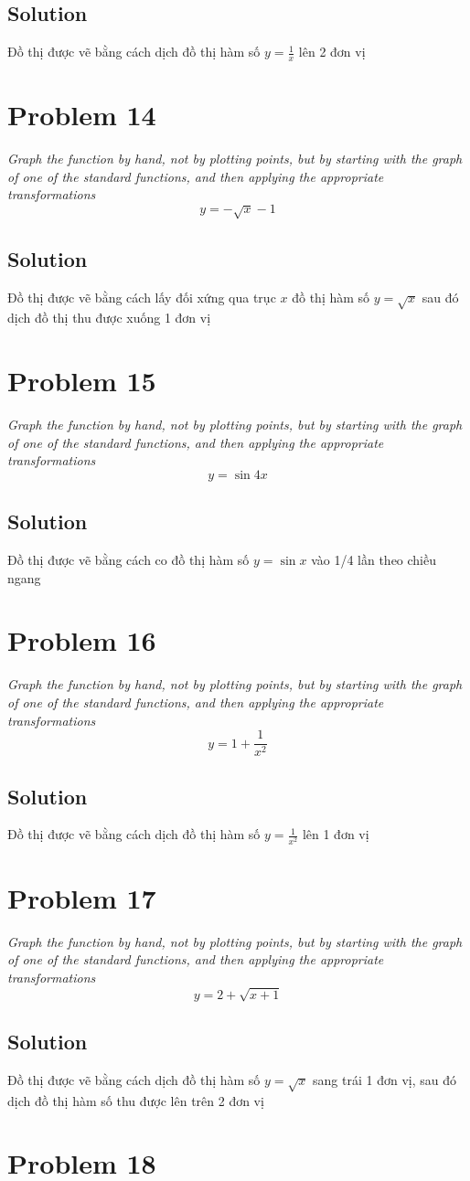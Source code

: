 \documentclass[11pt]{article}
\newcommand{\soln}{\subsection*}
\newcommand{\qn}{\textit}
\begin{document}
\soln{Solution}
Đồ thị được vẽ bằng cách dịch đồ thị hàm số $y=\frac{1}{x}$ lên 2 đơn vị

\section*{Problem 14}

\qn{Graph the function by hand, not by plotting points, but by starting with the graph of one of the standard functions, and then applying the appropriate transformations $$y=-\sqrt{x}-1$$}

\soln{Solution}
Đồ thị được vẽ bằng cách lấy đối xứng qua trục $x$ đồ thị hàm số $y=\sqrt{x}$ sau đó dịch đồ thị thu được xuống 1 đơn vị

\section*{Problem 15}

\qn{Graph the function by hand, not by plotting points, but by starting with the graph of one of the standard functions, and then applying the appropriate transformations $$y=\sin{4x}$$}

\soln{Solution}
Đồ thị được vẽ bằng cách co đồ thị hàm số $y=\sin{x}$ vào 1/4 lần theo chiều ngang

\section*{Problem 16}

\qn{Graph the function by hand, not by plotting points, but by starting with the graph of one of the standard functions, and then applying the appropriate transformations $$y=1+\frac{1}{x^2}$$}

\soln{Solution}
Đồ thị được vẽ bằng cách dịch đồ thị hàm số $y=\frac{1}{x^2}$ lên 1 đơn vị

\section*{Problem 17}

\qn{Graph the function by hand, not by plotting points, but by starting with the graph of one of the standard functions, and then applying the appropriate transformations $$y=2+\sqrt{x+1}$$}

\soln{Solution}
Đồ thị được vẽ bằng cách dịch đồ thị hàm số $y=\sqrt{x}$ sang trái 1 đơn vị, sau đó dịch đồ thị hàm số thu được lên trên 2 đơn vị

\section*{Problem 18}
\end{document}
